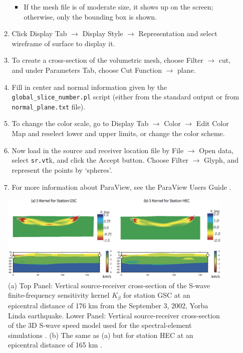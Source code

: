 \begin{enumerate}
\begin{enumerate}
\begin{itemize}
\item If the mesh file is of moderate size, it shows up on the screen; otherwise,
only the bounding box is shown.
\end{itemize}
\item Click \textsf{Display Tab} $\rightarrow$ \textsf{Display Style} $\rightarrow$
\textsf{Representation} and select \textsf{wireframe of surface} to
display it.
\item To create a cross-section of the volumetric mesh, choose \textsf{Filter}
$\rightarrow$ \textsf{cut}, and under \textsf{Parameters Tab}, choose
\textsf{Cut Function} $\rightarrow$ \textsf{plane}.
\item Fill in center and normal information given by the \texttt{global\_slice\_number.pl}
script (either from the standard output or from \texttt{normal\_plane.txt}
file).
\item To change the color scale, go to \textsf{Display Tab} $\rightarrow$
\textsf{Color} $\rightarrow$ \textsf{Edit Color Map} and reselect
lower and upper limits, or change the color scheme.
\item Now load in the source and receiver location file by \textsf{File}
$\rightarrow$ \textsf{Open data}, select \texttt{sr.vt}k, and click
the \textsf{Accept} button. Choose \textsf{Filter} $\rightarrow$
\textsf{Glyph}, and represent the points by `\textsf{spheres}'.
\item For more information about ParaView, see the ParaView Users Guide
.
\end{enumerate}
\end{enumerate}
%
\begin{figure}[H]
\begin{centering}
\includegraphics[width=6in]{figures/3D-S-Kernel.jpg}
\par
\end{centering}
\caption{(a) Top Panel: Vertical source-receiver cross-section of the S-wave
finite-frequency sensitivity kernel $K_{\beta}$ for station GSC at
an epicentral distance of 176 km from the September 3, 2002, Yorba
Linda earthquake. Lower Panel: Vertical source-receiver cross-section
of the 3D S-wave speed model used for the spectral-element simulations
\citep{KoLiTrSuStSh04}. (b) The same as (a) but for station HEC at
an epicentral distance of 165 km \citep{LiTr06}.}
\label{figure:P-wave-speed-finite-frequency}
\end{figure}


